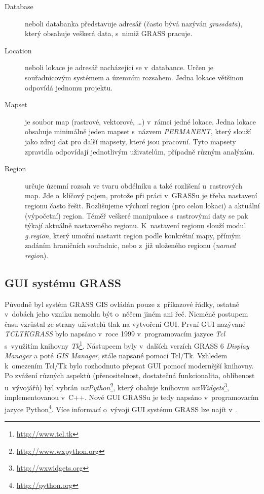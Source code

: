 \documentclass[a4paper,12pt,draft]{article}
\begin{document}
\begin{description}
\item[Database] neboli databanka představuje adresář (často bývá nazýván 
\emph{grassdata}), který obsahuje veškerá data, s~nimiž GRASS pracuje.
\item [Location] neboli lokace je adresář nacházející se
v~databance. Určen je souřadni\-covým systémem a územním rozsahem. Jedna
lokace většinou odpovídá jednomu projektu.
\item [Mapset] je soubor map (rastrové, vektorové, \ldots) v~rámci
jedné lokace. Jedna lokace obsahuje minimálně jeden mapset s~názvem
\emph{PERMANENT}, který  slouží jako zdroj dat pro další mapsety, které jsou
pracovní. Tyto mapsety zpravidla odpovídají jednotlivým uživatelům,
případně různým analýzám.
\item [Region] určuje územní rozsah ve tvaru obdélníku a také
rozlišení u~rastrových map. Jde o~klíčový
pojem, protože při práci v~GRASSu je třeba nastavení regionu často
řešit.  Rozlišujeme výchozí region (pro celou lokaci) a aktuální
(výpočetní) region. Téměř veškeré manipulace s~rastrovými daty se pak
týkají aktuálně nastaveného regionu. K~nastavení regionu slouží
modul \emph{g.region}, který umožní nastavit region podle konkrétní mapy,
přímým zadá\-ním hraničních souřadnic, nebo z~již uloženého regionu
(\emph{named region}).
 \end{description}



\subsection{GUI systému GRASS}
Původně byl systém GRASS GIS ovládán pouze z~příkazové
řádky, ostatně v~dobách jeho vzniku nemohla být o~něčem jiném ani
řeč. Nicméně postupem času vzrůstal ze strany uživatelů tlak na
vytvoření GUI. První GUI nazývané \emph{TCLTKGRASS}
bylo napsáno v~roce 1999 v~programovacím jazyce \emph{Tcl} s~využitím
knihovny \emph{Tk}\footnote{\url{http://www.tcl.tk}}.
Nástupcem byly v~dalších verzích GRASS 6 \emph{Display
Manager} a poté \emph{GIS Manager}, stále napsané pomocí Tcl/Tk. Vzhledem
k~omezením Tcl/Tk bylo rozhodnuto přepsat GUI pomocí
modernější knihovny. Po zvážení různých aspektů (přenositel\-nost,
dostatečná funkcionalita, oblíbenost u~vývojářů) 
byl vybrán \emph{wxPython}\footnote{\url{http://www.wxpython.org}}, který
obaluje knihovnu \emph{wxWidgets}\footnote{\url{http://wxwidgets.org}},
implementovanou v~C++. Nové GUI GRASSu je
tedy napsáno v~programovacím jazyce
Python\footnote{\url{http://python.org}}.
Více informací o~vývoji GUI sys\-tému GRASS lze najít
v~\cite{wxGUI_clanek}.
\end{document}
